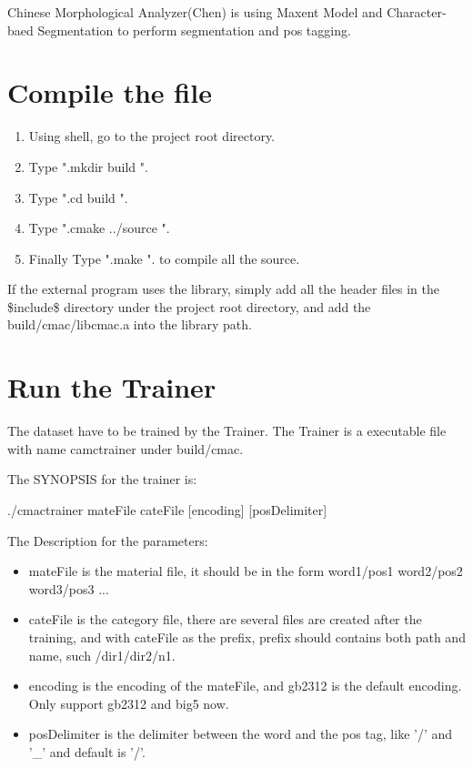 Chinese Morphological Analyzer(Chen) is using Maxent Model and Character-baed Segmentation to perform segmentation and pos tagging.\section{Compile the file}\label{index_compilefile}
\begin{enumerate}
\item Using shell, go to the project root directory. \item Type ".mkdir build ". \item Type ".cd build ". \item Type ".cmake ../source ". \item Finally Type ".make ". to compile all the source. \end{enumerate}


If the external program uses the library, simply add all the header files in the \$include\$ directory under the project root directory, and add the build/cmac/libcmac.a into the library path.\section{Run the Trainer}\label{index_runtrainer}
The dataset have to be trained by the Trainer. The Trainer is a executable file with name camctrainer under build/cmac.

The SYNOPSIS for the trainer is: \par
 ./cmactrainer mateFile cateFile [encoding] [posDelimiter] \par


\par
The Description for the parameters: \begin{itemize}
\item mateFile is the material file, it should be in the form word1/pos1 word2/pos2 word3/pos3 ... \item cateFile is the category file, there are several files are created after the training, and with cateFile as the prefix, prefix should contains both path and name, such /dir1/dir2/n1. \item encoding is the encoding of the mateFile, and gb2312 is the default encoding. Only support gb2312 and big5 now. \item posDelimiter is the delimiter between the word and the pos tag, like '/' and '\_\-' and default is '/'. \end{itemize}


